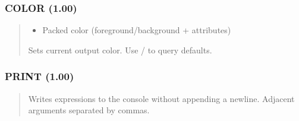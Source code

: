 \documentclass[letterpaper,10pt,english]{sphinxmanual}
\begin{document}
\subsubsection{COLOR (1.00)}
\label{\detokenize{ppl:color-1-00}}\begin{quote}

\sphinxAtStartPar
{}
\begin{description}
\begin{itemize}
\item {} 
\sphinxAtStartPar
{} \textendash{} Packed color (foreground/background + attributes)

\end{itemize}

\sphinxAtStartPar
Sets current output color. Use  /  to query defaults.

\begin{sphinxVerbatim}[commandchars=\\\{\}]
 
 
\end{sphinxVerbatim}

\end{description}
\end{quote}


\subsubsection{PRINT (1.00)}
\label{\detokenize{ppl:print-1-00}}\begin{quote}

\sphinxAtStartPar
{}
\begin{description}
\sphinxAtStartPar
Writes expressions to the console without appending a newline. Adjacent arguments separated by commas.

\begin{sphinxVerbatim}[commandchars=\\\{\}]
  
\end{sphinxVerbatim}

\end{description}
\end{quote}
\end{document}
